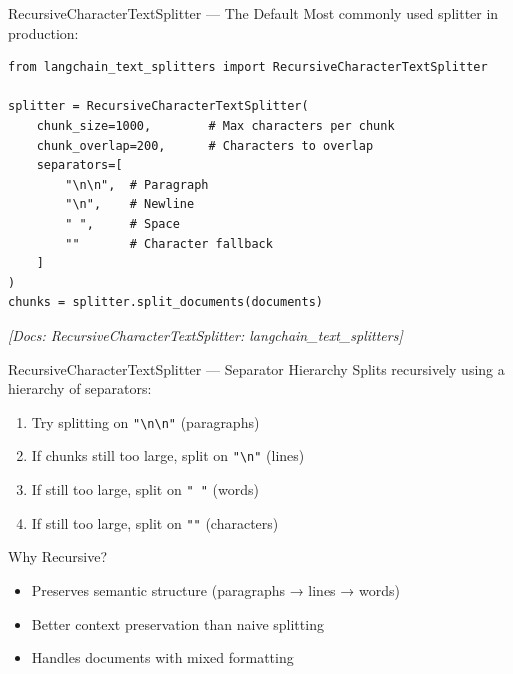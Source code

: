 \documentclass[aspectratio=169,11pt]{beamer}
\newcommand{\docref}[1]{{\scriptsize\color{docgray}[Docs: #1]}}
\begin{document}
\begin{frame}[fragile]{RecursiveCharacterTextSplitter --- The Default}
  Most commonly used splitter in production:
  \begin{lstlisting}
from langchain_text_splitters import RecursiveCharacterTextSplitter

splitter = RecursiveCharacterTextSplitter(
    chunk_size=1000,        # Max characters per chunk
    chunk_overlap=200,      # Characters to overlap
    separators=[
        "\n\n",  # Paragraph
        "\n",    # Newline
        " ",     # Space
        ""       # Character fallback
    ]
)
chunks = splitter.split_documents(documents)
  \end{lstlisting}

  \vspace{0.5cm}
  \textit{\docref{RecursiveCharacterTextSplitter: langchain\_text\_splitters}}
\end{frame}

\begin{frame}{RecursiveCharacterTextSplitter --- Separator Hierarchy}
  Splits recursively using a hierarchy of separators:

  \begin{enumerate}
    \item Try splitting on \texttt{"\textbackslash n\textbackslash n"} (paragraphs)
    \item If chunks still too large, split on \texttt{"\textbackslash n"} (lines)
    \item If still too large, split on \texttt{" "} (words)
    \item If still too large, split on \texttt{""} (characters)
  \end{enumerate}

  \vspace{1cm}
  \begin{conceptbox}{Why Recursive?}
    \begin{itemize}
    \setlength{\itemsep}{1pt}
      \item Preserves semantic structure (paragraphs → lines → words)
      \item Better context preservation than naive splitting
      \item Handles documents with mixed formatting
    \end{itemize}
  \end{conceptbox}
\end{frame}
\end{document}
